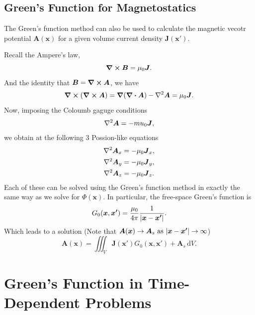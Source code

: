 \documentclass[12pt,english]{article}
\newcommand{\dmr}[1]{\, \mathrm{d}#1} %
\renewcommand{\vec}[1]{\boldsymbol{#1}}
\begin{document}
\subsection{Green's Function for Magnetostatics}
The Green's function method can also be used to calculate the magnetic vecotr potential $\vec{A}(\vec{x})$ for a given volume current density $\vec{J}(\vec{x'})$.

Recall the Ampere's law,
\begin{equation*}
    \curl \vec{B} = \mu_0 \vec{J}.
\end{equation*}
And the identity that $\vec{B} = \curl \vec{A}$, we have
\begin{equation*}
    \curl (\curl \vec{A}) = \grad(\div \vec{A}) - \laplacian \vec{A} = \mu_0 \vec{J}.
\end{equation*}
Now, imposing the Coloumb gaguge conditions
\begin{equation}
    \laplacian \vec{A} = -mu_0 \vec{J},
\end{equation}
we obtain at the following 3 Possion-like equations
\begin{subequations}
    \begin{align}
        \laplacian \vec{A}_x & = -\mu_0 \vec{J}_x, \\
        \laplacian \vec{A}_y & = -\mu_0 \vec{J}_y, \\
        \laplacian \vec{A}_z & = -\mu_0 \vec{J}_z.
    \end{align}
\end{subequations}
Each of these can be solved using the Green's function method in exactly the same way as we solve for $\Phi(\vec{x})$. In particular, the free-space Green's function is
\begin{equation}
    G_0(\vec{x}, \vec{x'}) = \frac{\mu_0}{4\pi}\frac{1}{\abs{\vec{x}-\vec{x'}}}.
\end{equation}
Which leads to a solution (Note that $\vec{A}(\vec{x}) \to \vec{A}_s \text{ as } \abs{\vec{x} - \vec{x'}} \to \infty$)
\begin{equation}
    \vec{A}(\vec{x}) = \iiint_V \vec{J}(\vec{x'}) G_0(\vec{x}, \vec{x'}) + \vec{A}_s \dmr{V}.
\end{equation}



\section{Green's Function in Time-Dependent Problems}
\end{document}
